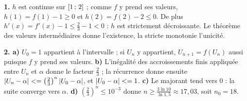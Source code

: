 \begin{corrige}
\textbf{1.} $h$ est continue sur $\left[1\,;\,2\right]$ ; comme $f$ y prend ses
valeurs, $h(1) = f(1)-1 \geq 0$ et $h(2) = f(2)-2 \leq 0$. De plus
$h'(x) = f'(x)-1 \leq \frac23-1<0$ : $h$ est strictement décroissante. Le
théorème des valeurs intermédiaires donne l'existence, la stricte monotonie
l'unicité.

\textbf{2. a)} $U_{0} = 1$ appartient à l'intervalle ; si $U_{n}$ y
appartient, $U_{n+1} = f(U_{n})$ aussi puisque $f$ y prend ses valeurs.
\textbf{b)} L'inégalité des accroissements finis appliquée entre $U_{n}$ et
$\alpha$ donne le facteur $\frac23$ ; la récurrence donne ensuite
$\left|U_{n}-\alpha\right| <= \left(\frac23\right)^{n}\left|U_{0}-\alpha\right|$, et
$\left|U_{0}-\alpha\right| <= 1$.
\textbf{c)} Le majorant tend vers $0$ : la suite converge vers $\alpha$.
\textbf{d)} $\left(\frac23\right)^{n} \leq 10^{-3}$ donne
$n \geq \frac{3\ln10}{\ln1{,}5} \approx 17{,}03$, soit $n_{0} = 18$.
\end{corrige}
